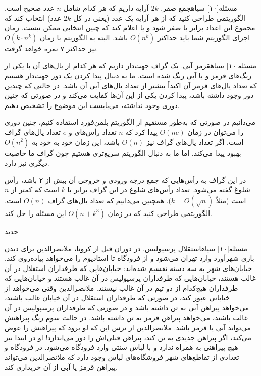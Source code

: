 ‌مسئله[۱۰] ‌سیاه{جمع صفر}.
$2k$
آرایه داریم که هر کدام شامل $n$ عدد صحیح است. الگوریتمی طراحی کنید که از هر آرایه یک عدد (یعنی در کل
$2k$
عدد) انتخاب کند که مجموع این اعداد برابر با صفر شود و یا اعلام کند که چنین انتخابی ممکن نیست. زمان اجرای الگوریتم شما باید حداکثر $O(n^k)$ باشد. البته به الگوریتم با زمان
$O(k\cdot n^k)$
نیز حداکثر ۷ نمره خواهد گرفت.

\vspace{0.5cm}

‌مسئله[۱۰] ‌سیاه{قرمز آبی}.
یک گراف جهت‌دار داریم که هر کدام از یال‌های آن با یکی از رنگ‌های قرمز و یا آبی رنگ شده است. ما به دنبال پیدا کردن یک دور جهت‌دار هستیم که تعداد یال‌های قرمز آن اکیداً بیشتر از تعداد یال‌های آبی آن باشد. در حالتی که چندین دور وجود داشته باشد، پیدا کردن یکی از این آن‌ها کفایت می‌کند و در صورتی که چنین دوری وجود نداشته، می‌بایست این موضوع را تشخیص دهیم.

می‌دانیم در صورتی که به‌طور مستقیم از الگوریتم بلمن‌فورد استفاده کنیم، چنین دوری را می‌توان در زمان $O(ne)$ پیدا کرد که $n$ تعداد رأس‌های و $e$ تعداد یال‌های گراف است. 
اگر تعداد یال‌های گراف نیز $O(n)$ باشد، این زمان خود به خود به $O(n^2)$ بهبود پیدا می‌کند.
اما ما به دنبال الگوریتم سریع‌تری هستیم چون گراف ما خاصیت دیگری نیز دارد.

در این گراف به رأس‌هایی که جمع درجه ورودی و خروجی آن بیش از ۲ باشد، رأس شلوغ گفته می‌شود. تعداد رأس‌های شلوغ در این گراف برابر با $k$ است که کمتر از $n$ است (مثلاً $k=O(\sqrt{n})$). همچنین می‌دانیم که تعداد یال‌های گراف $O(n)$ است. الگوریتمی طراحی کنید که در زمان $O(n+k^3)$ این مسئله را حل کند. 

‌جدید

‌مسئله[۱۰] ‌سیاه{استقلال پرسپولیس}.
در دوران قبل از کرونا، ملانصرالدین برای دیدن بازی شهرآورد وارد تهران می‌شود و از فرودگاه تا استادیوم را می‌خواهد پیاده‌روی کند. خیابان‌های شهر به سه دسته تقسیم شده‌اند: خیابان‌هایی که طرفداران استقلال در آن غالب هستند، خیابان‌هایی که طرفداران پرسپولیس در آن غالب هستند و خیابان‌هایی که طرفداران هیچ‌کدام از دو تیم در آن غالب نیستند. ملانصرالدین وقتی می‌خواهد از خیابانی عبور کند، در صورتی که طرفداران استقلال در آن خیابان غالب باشند، می‌خواهد پیراهن آبی به تن داشته باشد و در صورتی که طرفداران پرسپولیس در آن غالب باشند، می‌خواهد پیراهن قرمز به تن داشته باشد. در حالت سوم رنگ پیراهنش می‌تواند آبی یا قرمز باشد. ملانصرالدین از ترس این که لو برود که پیراهنش را عوض می‌کند، اگر پیراهن جدیدی به تن کند، پیراهن قبلی‌اش را دور می‌اندازد! او در ابتدا نیز هیچ پیراهنی به همراه ندارد و با لباس سنتی وارد فرودگاه می‌شود.
در فرودگاه و تعدادی از تقاطع‌های شهر فروشگاه‌های لباس وجود دارد که ملانصرالدین می‌تواند پیراهن قرمز یا آبی از آن خریداری کند.

